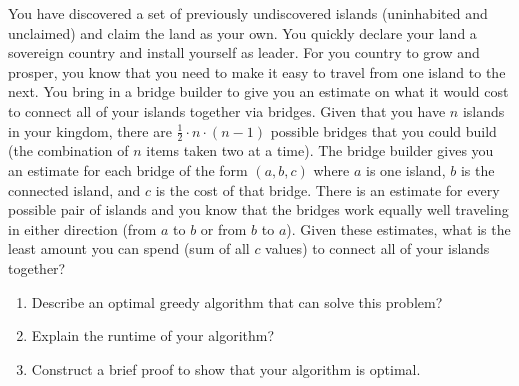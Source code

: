 \documentclass[10pt]{article}
\begin{document}
You have discovered a set of previously undiscovered islands (uninhabited and unclaimed) and claim the land as your own. You quickly declare your land a sovereign country and install yourself as leader. For you country to grow and prosper, you know that you need to make it easy to travel from one island to the next. You bring in a bridge builder to give you an estimate on what it would cost to connect all of your islands together via bridges. Given that you have $n$ islands in your kingdom, there are $\frac{1}{2} \cdot n \cdot (n-1)$ possible bridges that you could build (the combination of $n$ items taken two at a time). The bridge builder gives you an estimate for each bridge of the form $(a,b,c)$ where $a$ is one island, $b$ is the connected island, and $c$ is the cost of that bridge. There is an estimate for every possible pair of islands and you know that the bridges work equally well traveling in either direction (from $a$ to $b$ or from $b$ to $a$). Given these estimates, what is the least amount you can spend (sum of all $c$ values) to connect all of your islands together?

\begin{enumerate}
\item Describe an optimal greedy algorithm that can solve this problem?

\solution{
}

\item Explain the runtime of your algorithm?

\solution{
}

\item Construct a brief proof to show that your algorithm is optimal.

\solution{
}

\end{enumerate}


\end{document}
